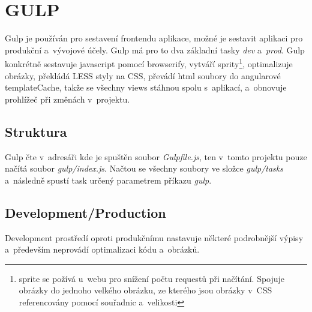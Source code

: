 \documentclass[a4paper,12pt,twoside,BCOR=10mm]{article}
\newcommand{\upc}[1]{\uppercase{#1}} %
\renewcommand{\it}[1]{\textit{#1}}    %
\begin{document}
\section{\upc{Gulp}}
Gulp je používán pro sestavení frontendu aplikace, možné je sestavit aplikaci pro produkční a~vývojové účely. Gulp má pro to dva základní tasky \it{dev} a~\it{prod}. Gulp konkrétně sestavuje javascript pomocí browserify, vytváří sprity\footnote{sprite se požívá u~webu pro snížení počtu requestů při načítání. Spojuje obrázky do jednoho velkého obrázku, ze kterého jsou obrázky v~CSS referencovány pomocí souřadnic a~velikosti }, optimalizuje obrázky, překládá LESS styly na CSS, převádí html soubory do angularové templateCache, takže se všechny views stáhnou spolu s~aplikací, a~obnovuje prohlížeč při změnách v~projektu.
\subsection{Struktura}
Gulp čte v~adresáři kde je spuštěn soubor \it{Gulpfile.js}, ten v~tomto projektu pouze načítá soubor \it{gulp/index.js}. Načtou se všechny soubory ve složce \it{gulp/tasks} a~následně spustí task určený parametrem příkazu \it{gulp}.

\subsection{Development/Production}
Development prostředí oproti produkčnímu nastavuje některé podrobnější výpisy a~především neprovádí optimalizaci kódu a~obrázků.\\
\end{document}
